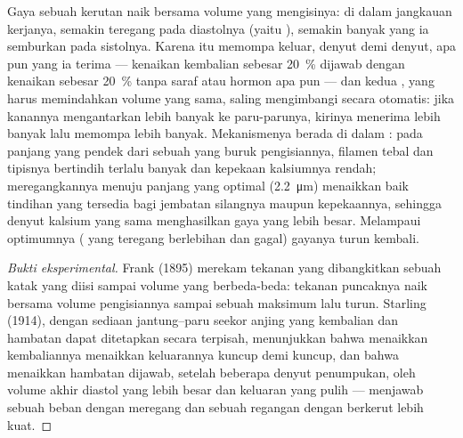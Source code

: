 \begin{theorem}\label{thm:b2:heart:starling}
Gaya sebuah kerutan  naik bersama volume yang mengisinya: di dalam
jangkauan kerjanya, semakin teregang  pada diastolnya (yaitu
\emph{}), semakin banyak yang ia semburkan pada sistolnya.
Karena itu  memompa keluar, denyut demi denyut, apa pun yang
ia terima --- kenaikan kembalian  sebesar \qty{20}{\%} dijawab
dengan kenaikan  sebesar \qty{20}{\%} tanpa saraf atau
hormon apa pun --- dan kedua , yang harus memindahkan volume
yang sama, saling mengimbangi secara otomatis: jika  kanannya
mengantarkan lebih banyak  ke paru-parunya,  kirinya
menerima lebih banyak lalu memompa lebih banyak. Mekanismenya berada di
dalam : pada panjang yang pendek dari sebuah  yang
buruk pengisiannya, filamen tebal dan tipisnya bertindih terlalu banyak
dan kepekaan kalsiumnya rendah; meregangkannya menuju panjang yang
optimal (\qty{2.2}{\micro m}) menaikkan baik tindihan yang tersedia
bagi jembatan silangnya maupun kepekaannya, sehingga denyut kalsium
yang sama menghasilkan gaya yang lebih besar. Melampaui optimumnya
( yang teregang berlebihan dan gagal) gayanya turun kembali.
\end{theorem}
\begin{proof}[Bukti eksperimental]
Frank (1895) merekam tekanan yang dibangkitkan sebuah  katak yang
diisi sampai volume yang berbeda-beda: tekanan puncaknya naik bersama
volume pengisiannya sampai sebuah maksimum lalu turun. Starling (1914),
dengan sediaan jantung--paru seekor anjing yang kembalian  dan
hambatan  dapat ditetapkan secara terpisah, menunjukkan bahwa
menaikkan kembaliannya menaikkan keluarannya kuncup demi kuncup, dan
bahwa menaikkan hambatan  dijawab, setelah beberapa denyut
penumpukan, oleh volume akhir diastol yang lebih besar dan keluaran
yang pulih ---  menjawab sebuah beban dengan meregang dan
sebuah regangan dengan berkerut lebih kuat.
\end{proof}

